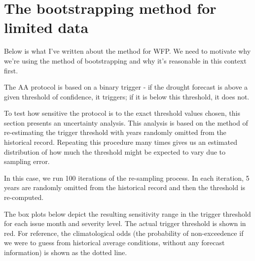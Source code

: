 \documentclass{ametsocV5}
\begin{document}
\section{The bootstrapping method for limited data}






Below is what I've written about the method for WFP. We need to motivate why we're using the method of bootstrapping and why it's reasonable in this context first.

The AA protocol is based on a binary trigger - if the drought forecast is above a given threshold of confidence, it triggers; if it is below this threshold, it does not.

To test how sensitive the protocol is to the exact threshold values chosen, this section presents an uncertainty analysis. This analysis is based on the method of re-estimating the trigger threshold with years randomly omitted from the historical record. Repeating this procedure many times gives us an estimated distribution of how much the threshold might be expected to vary due to sampling error.

In this case, we run 100 iterations of the re-sampling process. In each iteration, 5 years are randomly omitted from the historical record and then the threshold is re-computed.

The box plots below depict the resulting sensitivity range in the trigger threshold for each issue month and severity level. The actual trigger threshold is shown in red. For reference, the climatological odds (the probability of non-exceedence if we were to guess from historical average conditions, without any forecast information) is shown as the dotted line.
\end{document}
